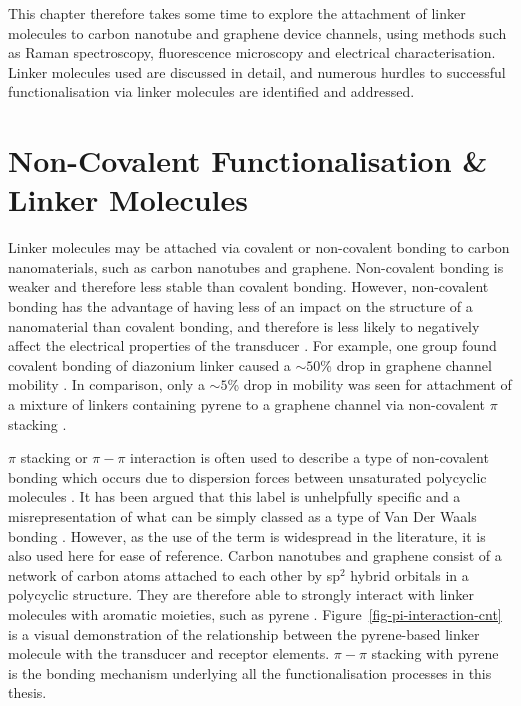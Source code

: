 \documentclass[
  a4paper,
]{scrbook}
\begin{document}
This chapter therefore takes some time to explore the attachment of
linker molecules to carbon nanotube and graphene device channels, using
methods such as Raman spectroscopy, fluorescence microscopy and
electrical characterisation. Linker molecules used are discussed in
detail, and numerous hurdles to successful functionalisation via linker
molecules are identified and addressed.

\hypertarget{non-covalent-functionalisation-linker-molecules}{%
\section{Non-Covalent Functionalisation \& Linker
Molecules}\label{non-covalent-functionalisation-linker-molecules}}

Linker molecules may be attached via covalent or non-covalent bonding to
carbon nanomaterials, such as carbon nanotubes and graphene.
Non-covalent bonding is weaker and therefore less stable than covalent
bonding. However, non-covalent bonding has the advantage of having less
of an impact on the structure of a nanomaterial than covalent bonding,
and therefore is less likely to negatively affect the electrical
properties of the transducer
\autocite{Long2012,DiCrescenzo2014,Wang2020,Mishyn2022}. For example,
one group found covalent bonding of diazonium linker caused a
\(\sim 50\)\% drop in graphene channel mobility \autocite{Lerner2014}.
In comparison, only a \(\sim 5\)\% drop in mobility was seen for
attachment of a mixture of linkers containing pyrene to a graphene
channel via non-covalent \(\pi\) stacking \autocite{Thodkar2021}.

\(\pi\) stacking or \(\pi-\pi\) interaction is often used to describe a
type of non-covalent bonding which occurs due to dispersion forces
between unsaturated polycyclic molecules \autocite{Perez2015}. It has
been argued that this label is unhelpfully specific and a
misrepresentation of what can be simply classed as a type of Van Der
Waals bonding \autocite{Martinez2012,Perez2015}. However, as the use of
the term is widespread in the literature, it is also used here for ease
of reference. Carbon nanotubes and graphene consist of a network of
carbon atoms attached to each other by sp\(^{2}\) hybrid orbitals in a
polycyclic structure. They are therefore able to strongly interact with
linker molecules with aromatic moieties, such as pyrene
\autocite{Hermanson2013-16,Perez2015,Mishyn2022}.
Figure~\ref{fig-pi-interaction-cnt} is a visual demonstration of the
relationship between the pyrene-based linker molecule with the
transducer and receptor elements. \(\pi-\pi\) stacking with pyrene is
the bonding mechanism underlying all the functionalisation processes in
this thesis.
\end{document}
